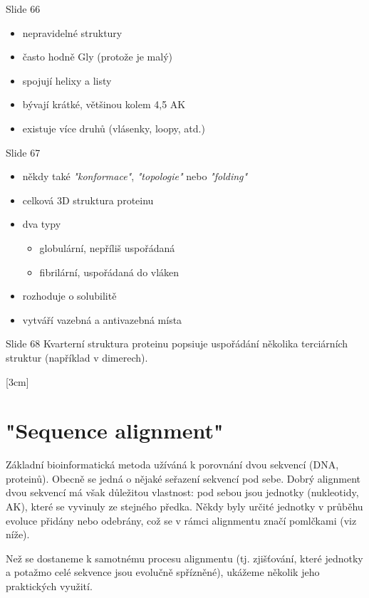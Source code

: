 \documentclass[DIV=8]{scrreprt}
\begin{document}
Slide 66
\begin{itemize}
    \item nepravidelné struktury
    \item často hodně Gly (protože je malý)
    \item spojují helixy a listy
    \item bývají krátké, většinou kolem 4,5 AK
    \item existuje více druhů (vlásenky, loopy, atd.)
\end{itemize}


Slide 67
\begin{itemize}
    \item někdy také \emph{"konformace"}, \emph{"topologie"} nebo \emph{"folding"}
    \item celková 3D struktura proteinu
    \item dva typy
\begin{itemize}
    \item globulární, nepříliš uspořádaná
    \item fibrilární, uspořádaná do vláken
\end{itemize}

    \item rozhoduje o solubilitě
    \item vytváří vazebná a antivazebná místa
\end{itemize}


Slide 68
Kvarterní struktura proteinu popsiuje uspořádání několika terciárních struktur (například v dimerech).

[3cm]

\chapter{"Sequence alignment"}

Základní bioinformatická metoda užíváná k porovnání dvou sekvencí (DNA, proteinů). Obecně se jedná o nějaké seřazení sekvencí pod sebe. Dobrý alignment dvou sekvencí má však důležitou vlastnost: pod sebou jsou jednotky (nukleotidy, AK), které se vyvinuly ze stejného předka. Někdy byly určité jednotky v průběhu evoluce přidány nebo odebrány, což se v rámci alignmentu značí pomlčkami (viz níže).

Než se dostaneme k samotnému procesu alignmentu (tj. zjišťování, které jednotky a potažmo celé sekvence jsou evolučně spřízněné), ukážeme několik jeho praktických využití.
\end{document}
